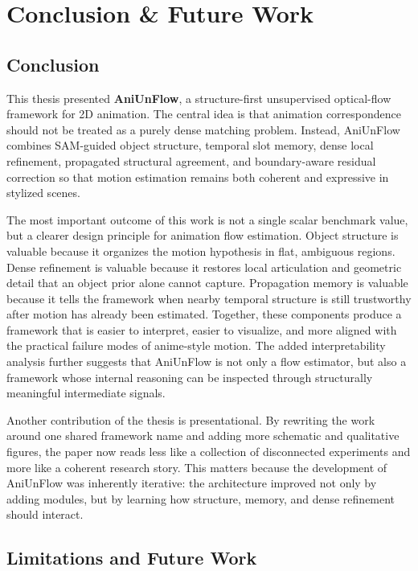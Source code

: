 \chapter{Conclusion \& Future Work}

\section{Conclusion}

This thesis presented \textbf{AniUnFlow}, a structure-first unsupervised optical-flow framework for 2D animation. The central idea is that animation correspondence should not be treated as a purely dense matching problem. Instead, AniUnFlow combines SAM-guided object structure, temporal slot memory, dense local refinement, propagated structural agreement, and boundary-aware residual correction so that motion estimation remains both coherent and expressive in stylized scenes.

The most important outcome of this work is not a single scalar benchmark value, but a clearer design principle for animation flow estimation. Object structure is valuable because it organizes the motion hypothesis in flat, ambiguous regions. Dense refinement is valuable because it restores local articulation and geometric detail that an object prior alone cannot capture. Propagation memory is valuable because it tells the framework when nearby temporal structure is still trustworthy after motion has already been estimated. Together, these components produce a framework that is easier to interpret, easier to visualize, and more aligned with the practical failure modes of anime-style motion. The added interpretability analysis further suggests that AniUnFlow is not only a flow estimator, but also a framework whose internal reasoning can be inspected through structurally meaningful intermediate signals.

Another contribution of the thesis is presentational. By rewriting the work around one shared framework name and adding more schematic and qualitative figures, the paper now reads less like a collection of disconnected experiments and more like a coherent research story. This matters because the development of AniUnFlow was inherently iterative: the architecture improved not only by adding modules, but by learning how structure, memory, and dense refinement should interact.

\section{Limitations and Future Work}

